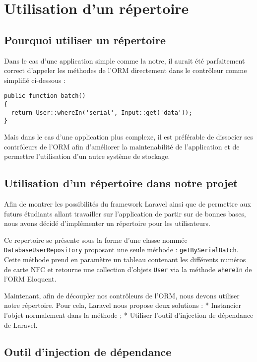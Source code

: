 \section{Utilisation d'un répertoire}

\subsection{Pourquoi utiliser un répertoire}

Dans le cas d'une application simple comme la notre, il aurait été parfaitement correct d'appeler les méthodes de l'ORM directement dans le contrôleur comme simplifié ci-dessous :
\begin{verbatim}
public function batch()
{
  return User::whereIn('serial', Input::get('data'));
}
\end{verbatim}

Mais dans le cas d'une application plus complexe, il est préférable de dissocier ses contrôleurs de l'ORM afin d'améliorer la maintenabilité de l'application et de permettre l'utilisation d'un autre système de stockage.

\subsection{Utilisation d'un répertoire dans notre projet}

Afin de montrer les possibilités du framework Laravel ainsi que de permettre aux futurs étudiants allant travailler sur l'application de partir sur de bonnes bases, nous avons décidé d'implémenter un répertoire pour les utilisateurs.

Ce repertoire se présente sous la forme d'une classe nommée \verb|DatabaseUserRepository| proposant une seule méthode : \verb|getBySerialBatch|. Cette méthode prend en paramètre un tableau contenant les différents numéros de carte NFC et retourne une collection d'objets \verb|User| via la méthode \verb|whereIn| de l'ORM Eloquent.

Maintenant, afin de découpler nos contrôleurs de l'ORM, nous devons utiliser notre répertoire. Pour cela, Laravel nous propose deux solutions :
  * Instancier l'objet normalement dans la méthode ;
  * Utiliser l'outil d'injection de dépendance de Laravel.

\subsection{Outil d'injection de dépendance}

